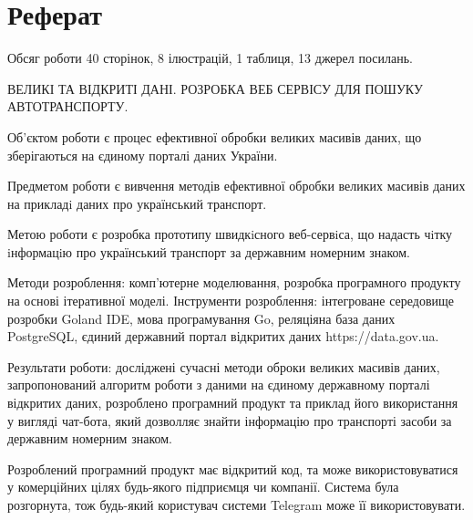\chapter*{Реферат}
Обсяг роботи 40 сторінок, 8 ілюстрацій, 1 таблиця, 13 джерел посилань.

ВЕЛИКІ ТА ВІДКРИТІ ДАНІ. РОЗРОБКА ВЕБ СЕРВІСУ ДЛЯ ПОШУКУ АВТОТРАНСПОРТУ.

Об’єктом роботи є процес ефективної обробки великих масивів даних,
що зберігаються на єдиному порталі даних України.

Предметом роботи є вивчення методів ефективної обробки
великих масивів даних на прикладi даних про український транспорт.

Метою роботи є розробка прототипу швидкiсного веб-сервiса,
що надасть чiтку iнформацiю про український транспорт за
державним номерним знаком.

Методи розроблення: комп’ютерне моделювання, розробка програмного продукту на основі ітеративної
моделі.
Інструменти розроблення: інтегроване середовище розробки Goland IDE,
мова програмування Go, реляціяна база даних PostgreSQL, єдиний державний портал відкритих даних https://data.gov.ua.

Результати роботи: досліджені сучасні методи оброки великих масивів даних,
запропонований алгоритм роботи з даними на єдиному державному порталі відкритих даних,
розроблено програмний продукт та приклад його використання у вигляді чат-бота,
який дозволляє знайти інформацію про транспорті засоби за державним номерним знаком.

Розроблений програмний продукт має відкритий код,
та може використовуватися у комерційних цілях будь-якого підприємця чи компанії.
Система була розгорнута, тож будь-який користувач системи Telegram може її використовувати.
